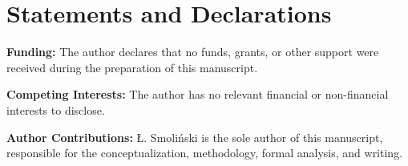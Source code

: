 \documentclass[10pt,a4paper]{article}
\begin{document}


\clearpage

\section*{Statements and Declarations}

\textbf{Funding:} The author declares that no funds, grants, or other support were received during the preparation of this manuscript.

\textbf{Competing Interests:} The author has no relevant financial or non-financial interests to disclose.

\textbf{Author Contributions:} Ł. Smoliński is the sole author of this manuscript, responsible for the conceptualization, methodology, formal analysis, and writing.

\clearpage
\end{document}
